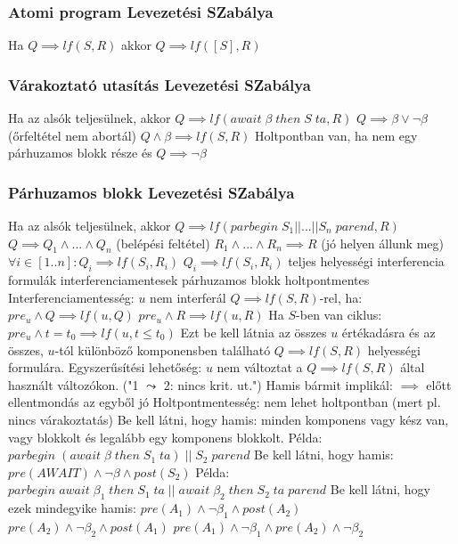 \documentclass[12pt,a4paper]{article}
\begin{document}
\subsubsection{Atomi program Levezetési SZabálya}

\begin{outline}
	\1 Ha $Q \implies lf(S,R)$ akkor $Q \implies lf([S],R)$
\end{outline}

\pagebreak

\subsubsection{Várakoztató utasítás Levezetési SZabálya}

\begin{outline}
	\1 Ha az alsók teljesülnek, akkor $Q \implies lf(await \; \beta \; then \; S \; ta, R)$
		\2 $Q \implies \beta \lor \lnot \beta$ \;\; (őrfeltétel nem abortál)
		\2 $Q \wedge \beta \implies lf(S,R)$
	\1 Holtpontban van, ha nem egy párhuzamos blokk része és $Q \implies \lnot \beta$
\end{outline}

\subsubsection{Párhuzamos blokk Levezetési SZabálya}

\begin{outline}
	\1 Ha az alsók teljesülnek, akkor $Q \implies lf(parbegin \; S_1||...||S_n \; parend, R)$
		\2 $Q \implies Q_1 \wedge ... \wedge Q_n$ \;\; (belépési feltétel)
		\2 $R_1 \wedge ... \wedge R_n \implies R$ \;\; (jó helyen állunk meg)
		\2 $\forall i \in [1..n] : Q_i \implies lf(S_i,R_i)$
		\2 $Q_i \implies lf(S_i,R_i)$ teljes helyességi interferencia formulák interferenciamentesek
		\2 párhuzamos blokk holtpontmentes
	\1 Interferenciamentesség: $u$ nem interferál $Q \implies lf(S,R)$-rel, ha:
		\2 $pre_u \wedge Q \implies lf(u,Q)$
		\2 $pre_u \wedge R \implies lf(u,R)$
		\2 Ha $S$-ben van ciklus: $pre_u \wedge t=t_0 \implies lf(u,t \le t_0)$
		\2 Ezt be kell látnia az összes $u$ értékadásra és az összes, $u$-tól különböző komponensben található $Q \implies lf(S,R)$ helyességi formulára.
		\2 Egyszerűsítési lehetőség: $u$ nem változtat a $Q \implies lf(S,R)$ által használt változókon. ("1 $\leadsto$ 2: nincs krit. ut.")
		\2 Hamis bármit implikál: $\implies$ előtt ellentmondás az egyből jó
	\1 Holtpontmentesség: nem lehet holtpontban (mert pl. nincs várakoztatás)
		\2 Be kell látni, hogy hamis: minden komponens vagy kész van, vagy blokkolt és legalább egy komponens blokkolt.
		\2 Példa: $parbegin \; (await \; \beta \; then \; S_1 \; ta) \; || \; S_2 \; parend$
			\3 Be kell látni, hogy hamis: $pre(AWAIT) \wedge \lnot \beta \wedge post(S_2)$
		\2 Példa: $parbegin \; await \; \beta_1 \; then \; S_1 \; ta \; || \; await \; \beta_2 \; then \; S_2 \; ta \; parend$
			\3 Be kell látni, hogy ezek mindegyike hamis:
			\3 $pre(A_1) \wedge \lnot \beta_1 \wedge post(A_2)$
			\3 $pre(A_2) \wedge \lnot \beta_2 \wedge post(A_1)$
			\3 $pre(A_1) \wedge \lnot \beta_1 \wedge pre(A_2) \wedge \lnot \beta_2$
\end{outline}
\end{document}

